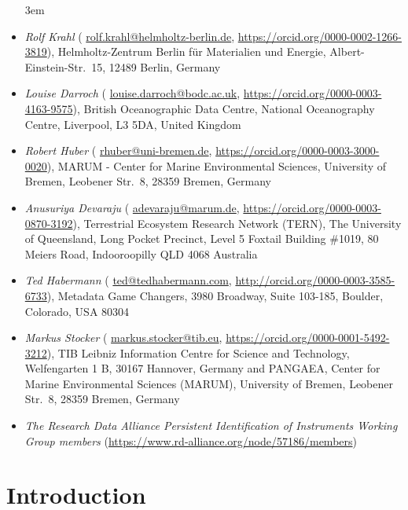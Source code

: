 \documentclass[titlepage=true,twoside=false,DIV=13]{scrartcl}
\begin{document}
\begin{itemize}\emergencystretch 3em
\item \emph{Rolf Krahl}
  ({\small
  \href{mailto:rolf.krahl@helmholtz-berlin.de}{rolf.krahl@helmholtz-berlin.de},
  \url{https://orcid.org/0000-0002-1266-3819}}),
  Helmholtz-Zentrum Berlin für Materialien und Energie,
  Albert-Einstein-Str.\ 15, 12489 Berlin, Germany
\item \emph{Louise Darroch}
  ({\small
  \href{mailto:louise.darroch@bodc.ac.uk}{louise.darroch@bodc.ac.uk},
  \url{https://orcid.org/0000-0003-4163-9575}}),
  British Oceanographic Data Centre, National Oceanography Centre,
  Liverpool, L3 5DA, United Kingdom
\item \emph{Robert Huber}
  ({\small
  \href{mailto:rhuber@uni-bremen.de}{rhuber@uni-bremen.de},
  \url{https://orcid.org/0000-0003-3000-0020}}),
  MARUM - Center for Marine Environmental Sciences, University of Bremen,
  Leobener Str.\ 8, 28359 Bremen, Germany
\item \emph{Anusuriya Devaraju}
  ({\small
  \href{mailto:adevaraju@marum.de}{adevaraju@marum.de},
  \url{https://orcid.org/0000-0003-0870-3192}}),
  Terrestrial Ecosystem Research Network (TERN), The University of
  Queensland, Long Pocket Precinct, Level 5 Foxtail Building \#1019,
  80 Meiers Road, Indooroopilly QLD 4068 Australia
\item \emph{Ted Habermann}
  ({\small
  \href{mailto:ted@tedhabermann.com}{ted@tedhabermann.com},
  \url{http://orcid.org/0000-0003-3585-6733}}),
  Metadata Game Changers,
  3980 Broadway, Suite 103-185, Boulder, Colorado, USA 80304
\item \emph{Markus Stocker}
  ({\small
  \href{mailto:markus.stocker@tib.eu}{markus.stocker@tib.eu},
  \url{https://orcid.org/0000-0001-5492-3212}}),
  TIB Leibniz Information Centre for Science and Technology,
  Welfengarten 1 B, 30167 Hannover, Germany and
  PANGAEA, Center for Marine Environmental Sciences (MARUM),
  University of Bremen, Leobener Str.\ 8, 28359 Bremen, Germany
\item \emph{The Research Data Alliance Persistent Identification of Instruments
  Working Group members}
  ({\small \url{https://www.rd-alliance.org/node/57186/members}})
\end{itemize}

\tableofcontents
\cleardoublepage
{}

\section{Introduction}
\label{intro}
\end{document}
